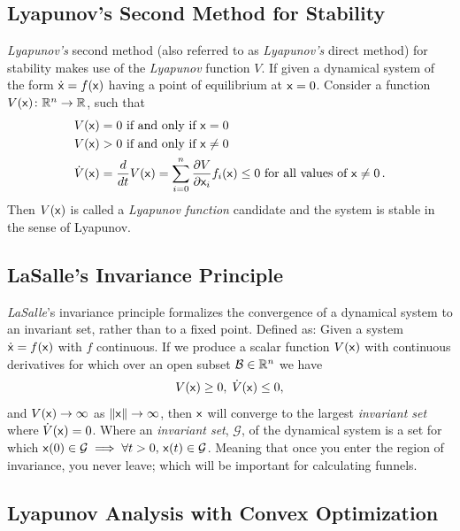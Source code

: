 \subsection{Lyapunov's Second Method for Stability}

\textit{Lyapunov's} second method (also referred to as \textit{Lyapunov's}
direct method) for stability makes use of the \textit{Lyapunov} function \(V\).
If given a dynamical system of the form \(\dot{{\mathbf{\mathsf{x}}}} = f({\mathbf{\mathsf{x}}})\) having
a point of equilibrium at \({\mathbf{\mathsf{x}}} = 0\). Consider a function \(V({\mathbf{\mathsf{x}}})
\colon \mathbb{R}^n \rightarrow \mathbb{R}\), such that
\begin{align*}
  V({\mathbf{\mathsf{x}}}) &= 0 \text{ if and only if } {\mathbf{\mathsf{x}}} = 0 \\
  V({\mathbf{\mathsf{x}}}) &> 0 \text{ if and only if } {\mathbf{\mathsf{x}}} \neq 0 \\
  \dot{V}({\mathbf{\mathsf{x}}}) &= \frac{d}{dt}V({\mathbf{\mathsf{x}}}) = \sum_{i=0}^{n} \frac{\partial V}{\partial {\mathbf{\mathsf{x}}}_i} f_i({\mathbf{\mathsf{x}}}) \leq 0 \text{ for all values of } {\mathbf{\mathsf{x}}} \neq 0 \, .
\end{align*}
Then \(V({\mathbf{\mathsf{x}}})\) is called a \textit{Lyapunov function} candidate and the
system is stable in the sense of Lyapunov.

\subsection{LaSalle's Invariance Principle}
\label{subsec:LaSalle's invariance principle}

\textit{LaSalle}'s invariance principle formalizes the convergence of a
dynamical system to an invariant set, rather than to a fixed point. Defined as:
Given a system \(\dot{{\mathbf{\mathsf{x}}}} = f({\mathbf{\mathsf{x}}})\) with \(f\) continuous. If we
produce a scalar function \(V({\mathbf{\mathsf{x}}})\) with continuous derivatives for which
over an open subset \(\mathcal{B} \in \mathbb{R}^n\) we have
\begin{align*}
  V({\mathbf{\mathsf{x}}}) \geq 0, \; \dot{V}({\mathbf{\mathsf{x}}}) \leq 0,
\end{align*}
and \(V({\mathbf{\mathsf{x}}}) \rightarrow \infty\) as \(\lVert{\mathbf{\mathsf{x}}}\rVert \rightarrow
\infty\), then \({\mathbf{\mathsf{x}}}\) will converge to the largest \textit{invariant set}
where \(\dot{V}({\mathbf{\mathsf{x}}}) = 0\). Where an \textit{invariant set},
\(\mathcal{G}\), of the dynamical system is a set for which \({\mathbf{\mathsf{x}}}(0) \in
\mathcal{G} \implies \forall t > 0,\, {\mathbf{\mathsf{x}}}(t) \in \mathcal{G}\). Meaning
that once you enter the region of invariance, you never leave; which will be
important for calculating funnels.

\subsection{Lyapunov Analysis with Convex Optimization}
\label{subsec:Lyapunov analysis with convex optimization}

